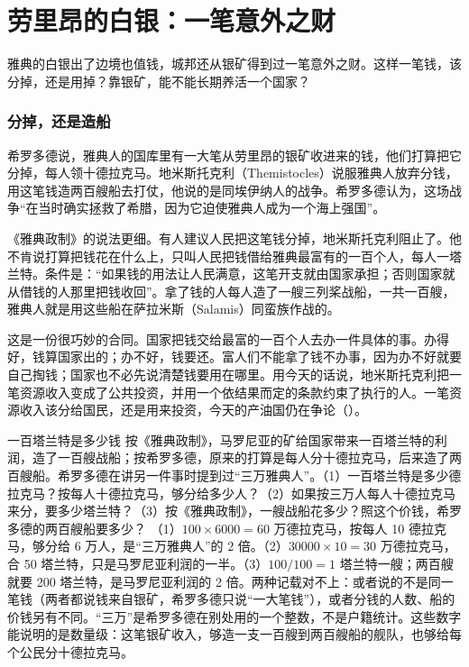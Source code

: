 \section{劳里昂的白银：一笔意外之财}\label{sec:greek-laurion}

雅典的白银出了边境也值钱，城邦还从银矿得到过一笔意外之财。这样一笔钱，该分掉，还是用掉？靠银矿，能不能长期养活一个国家？

\subsubsection{分掉，还是造船}
希罗多德说，雅典人的国库里有一大笔从劳里昂的银矿收进来的钱，他们打算把它分掉，每人领十德拉克马。地米斯托克利（Themistocles）说服雅典人放弃分钱，用这笔钱造两百艘船去打仗，他说的是同埃伊纳人的战争\cite{herodotus}。希罗多德认为，这场战争“在当时确实拯救了希腊，因为它迫使雅典人成为一个海上强国”\cite{herodotus}。

《雅典政制》的说法更细。有人建议人民把这笔钱分掉，地米斯托克利阻止了。他不肯说打算把钱花在什么上，只叫人民把钱借给雅典最富有的一百个人，每人一塔兰特。条件是：“如果钱的用法让人民满意，这笔开支就由国家承担；否则国家就从借钱的人那里把钱收回”\cite{athpol}。拿了钱的人每人造了一艘三列桨战船，一共一百艘，雅典人就是用这些船在萨拉米斯（Salamis）同蛮族作战的\cite{athpol}。

这是一份很巧妙的合同。国家把钱交给最富的一百个人去办一件具体的事。办得好，钱算国家出的；办不好，钱要还。富人们不能拿了钱不办事，因为办不好就要自己掏钱；国家也不必先说清楚钱要用在哪里。用今天的话说，地米斯托克利把一笔资源收入变成了公共投资，并用一个依结果而定的条款约束了执行的人。一笔资源收入该分给国民，还是用来投资，今天的产油国仍在争论（）。

\begin{example}{一百塔兰特是多少钱}\label{ex:greek-laurion}
按《雅典政制》，马罗尼亚的矿给国家带来一百塔兰特的利润，造了一百艘战船；按希罗多德，原来的打算是每人分十德拉克马，后来造了两百艘船。希罗多德在讲另一件事时提到过“三万雅典人”\cite{herodotus}。（1）一百塔兰特是多少德拉克马？按每人十德拉克马，够分给多少人？（2）如果按三万人每人十德拉克马来分，要多少塔兰特？（3）按《雅典政制》，一艘战船花多少？照这个价钱，希罗多德的两百艘船要多少？
\solution （1）$100\times6000=60$ 万德拉克马，按每人 10 德拉克马，够分给 6 万人，是“三万雅典人”的 2 倍。（2）$30000\times10=30$ 万德拉克马，合 50 塔兰特，只是马罗尼亚利润的一半。（3）$100/100=1$ 塔兰特一艘；两百艘就要 200 塔兰特，是马罗尼亚利润的 2 倍。两种记载对不上：或者说的不是同一笔钱（两者都说钱来自银矿，希罗多德只说“一大笔钱”），或者分钱的人数、船的价钱另有不同。“三万”是希罗多德在别处用的一个整数，不是户籍统计。这些数字能说明的是数量级：这笔银矿收入，够造一支一百艘到两百艘船的舰队，也够给每个公民分十德拉克马。
\end{example}


